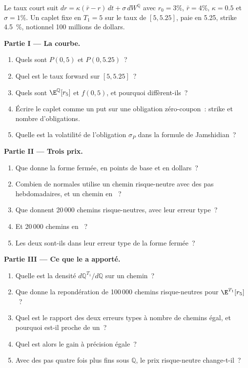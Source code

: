 \begin{problem}\label{pb:qm:girsanov-and-changes-of-numeraire:1}
Le taux court suit $dr = \kappa(\bar r - r)\,dt + \sigma\,dW^{\mathbb Q}$ avec $r_0 = 3\%$, $\bar r = 4\%$, $\kappa = 0.5$ et
$\sigma = 1\%$. Un caplet fixe en $T_1 = 5$ sur le taux de $[5, 5.25]$, paie en 5.25, strike 4.5~\%,
notionnel 100 millions de dollars.

\medskip\noindent\textbf{Partie I --- La courbe.}
\begin{enumerate}
\item Quels sont $P(0, 5)$ et $P(0, 5.25)$~?
\item Quel est le taux forward sur $[5, 5.25]$~?
\item Quels sont $\E^{\mathbb Q}[r_5]$ et $f(0, 5)$, et pourquoi diffèrent-ils~?
\item Écrire le caplet comme un put sur une obligation zéro-coupon~: strike et nombre d'obligations.
\item Quelle est la volatilité de l'obligation $\sigma_P$ dans la formule de Jamshidian~?
\end{enumerate}

\medskip\noindent\textbf{Partie II --- Trois prix.}
\begin{enumerate}[resume]
\item Que donne la forme fermée, en points de base et en dollars~?
\item Combien de normales utilise un chemin risque-neutre avec des pas hebdomadaires, et un chemin en ~?
\item Que donnent 20\,000 chemins risque-neutres, avec leur erreur type~?
\item Et 20\,000 chemins en ~?
\item Les deux sont-ils dans leur erreur type de la forme fermée~?
\end{enumerate}

\medskip\noindent\textbf{Partie III --- Ce que le  a apporté.}
\begin{enumerate}[resume]
\item Quelle est la densité $d\mathbb Q^{T_1}/d\mathbb Q$ sur un chemin~?
\item Que donne la repondération de 100\,000 chemins risque-neutres pour $\E^{T_1}[r_5]$~?
\item Quel est le rapport des deux erreurs types à nombre de chemins égal, et pourquoi est-il proche de un~?
\item Quel est alors le gain à précision égale~?
\item Avec des pas quatre fois plus fins sous $\mathbb Q$, le prix risque-neutre change-t-il~?
\end{enumerate}


\end{problem}
